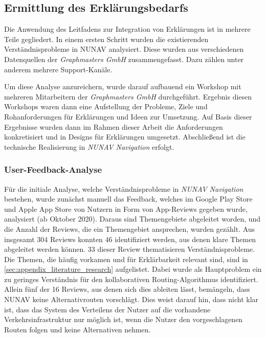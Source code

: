 \subsection{Ermittlung des Erklärungsbedarfs}
\label{sec:explanation_demand_generation}

Die Anwendung des Leitfadens zur Integration von Erklärungen ist in mehrere Teile gegliedert. In einem ersten Schritt wurden die existierenden Verständnisprobleme in NUNAV analysiert. Diese wurden aus verschiedenen Datenquellen der \textit{Graphmasters GmbH} zusammengefasst. Dazu zählen unter anderem mehrere Support-Kanäle.

Um diese Analyse anzureichern, wurde darauf aufbauend ein Workshop mit mehreren Mitarbeitern der \textit{Graphmasters GmbH} durchgeführt. Ergebnis diesen Workshops waren dann eine Aufstellung der Probleme, Ziele und Rohanforderungen für Erklärungen und Ideen zur Umsetzung. Auf Basis dieser Ergebnisse wurden dann im Rahmen dieser Arbeit die Anforderungen konkretisiert und in Designs für Erklärungen umgesetzt. Abschließend ist die technische Realisierung in \textit{NUNAV Navigation} erfolgt.

\subsubsection{User-Feedback-Analyse}

Für die initiale Analyse, welche Verständnisprobleme in \textit{NUNAV Navigation} bestehen, wurde zunächst manuell das Feedback, welches im Google Play Store und Apple App Store von Nutzern in Form von App-Reviews gegeben wurde, analysiert (ab Oktober 2020). Daraus sind Themengebiete abgeleitet worden, und die Anzahl der Reviews, die ein Themengebiet ansprechen, wurden gezählt. Aus insgesamt 304 Reviews konnten 46 identifiziert werden, aus denen klare Themen abgeleitet werden können. 33 dieser Review thematisieren Verständnisprobleme. Die Themen, die häufig vorkamen und für Erklärbarkeit relevant sind, sind in \autoref{sec:appendix_literature_research} aufgelistet. Dabei wurde als Hauptproblem ein zu geringes Verständnis für den kollaborativen Routing-Algorithmus identifiziert. Allein fünf der 16 Reviews, aus denen sich dies ableiten lässt, bemängeln, dass NUNAV keine Alternativrouten vorschlägt. Dies weist darauf hin, dass nicht klar ist, dass das System des Verteilens der Nutzer auf die vorhandene Verkehrsinfrastruktur nur möglich ist, wenn die Nutzer den vorgeschlagenen Routen folgen und keine Alternativen nehmen.

